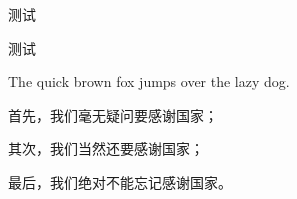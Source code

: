 \documentclass[
    bachelor, 
    ]{xjtuthesis}
\begin{document}

                    测试


                        测试



                The quick brown fox jumps over the lazy dog.

    \xjtuendappendix


        首先，我们毫无疑问要感谢国家；

        其次，我们当然还要感谢国家；

        最后，我们绝对不能忘记感谢国家。
\end{document}
